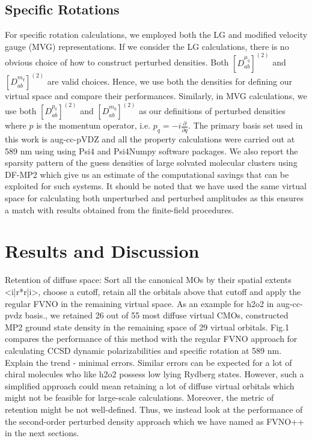\subsection{Specific Rotations}
For specific rotation calculations, we employed both the LG and modified velocity gauge (MVG)\cite{} 
representations. If we consider the LG calculations, there is no obvious
choice of how to construct perturbed densities. Both $[{D^{\mu_q}_{ab}}]^{(2)}$ 
and $[{D^{m_q}_{ab}}]^{(2)}$ are valid choices. Hence, we use both the densities
for defining our virtual space and compare their performances.
Similarly, in MVG calculations, we use both $[{D^{p_q}_{ab}}]^{(2)}$ 
and $[{D^{m_q}_{ab}}]^{(2)}$ as our definitions of 
perturbed densities where $p$ is the momentum operator, i.e. 
$p_q = -i\frac{\partial}{\partial{q}}$. 
The primary basis set used in this work is aug-cc-pVDZ\cite{}
and all the property calculations were carried out at 589 nm using 
using Psi4 and Psi4Numpy software packages.\cite{}
We also report the sparsity pattern of the guess densities of large
solvated molecular clusters using DF-MP2 which give us an estimate of 
the computational savings that can be exploited for such systems. It should 
be noted that we have used the same virtual space for calculating both unperturbed 
and perturbed amplitudes as this ensures a match with results obtained from 
the finite-field procedures. 
\section{Results and Discussion}
Retention of diffuse space: Sort all the canonical MOs by their spatial
extents <i|r*r|i>, choose a cutoff, retain all the orbitals above that cutoff
and apply the regular FVNO in the remaining virtual space. As an example
for h2o2 in aug-cc-pvdz basis., we retained 26 out of 55 most diffuse virtual 
CMOs, constructed MP2 ground state density in the remaining space of 
29 virtual orbitals. Fig.1 compares the performance of this method 
with the regular FVNO approach for calculating CCSD dynamic polarizabilities
and specific rotation at 589 nm. Explain the trend - minimal errors. Similar
errors can be expected for a lot of chiral molecules who like h2o2 possess 
low lying Rydberg states. However, such a simplified approach could mean 
retaining a lot of diffuse virtual orbitals which might not be feasible 
for large-scale calculations. Moreover, the metric of retention might
be not well-defined. Thus, we instead look at the performance
of the second-order perturbed density approach which we have named as FVNO++ 
in the next sections.
